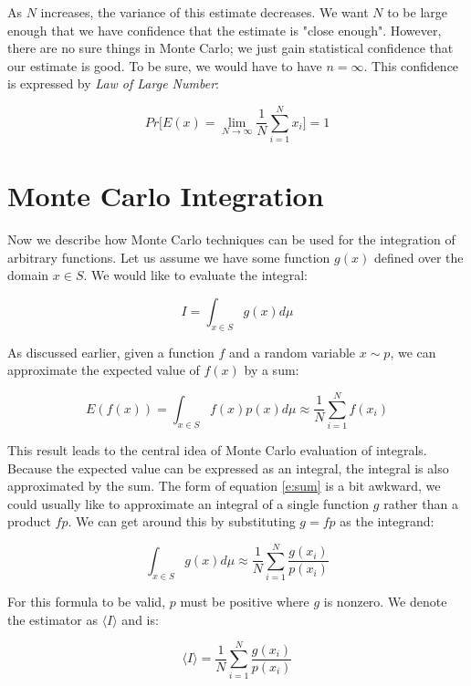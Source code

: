 As $N$ increases, the variance of this estimate decreases. We want $N$ to be large enough that we have confidence that the estimate is "close enough". However, there are no sure things in Monte Carlo; we just gain statistical confidence that our estimate is good. To be sure, we would have to have $n=\infty$. This confidence is expressed by \textit{Law of Large Number}:

\begin{equation}
	Pr\Bigg[ E(x)=\lim_{N \to \infty}\frac{1}{N}\sum_{i=1}^{N}x_i \Bigg]=1
\end{equation} 



\section{Monte Carlo Integration}\label{sec:Monte-Carlo-Integration}
Now we describe how Monte Carlo techniques can be used for the integration of arbitrary functions. Let us assume we have some function $g(x)$ defined over the domain $x\in S$. We would like to evaluate the integral:

\begin{equation}
	I=\int_{x\in S}g(x)d\mu
\end{equation}

As discussed earlier, given a function $f$ and a random variable $x\sim p$, we can approximate the expected value of $f(x)$ by a sum:

\begin{equation}\label{e:sum}
	E(f(x))=\int_{x\in S}f(x)p(x)d\mu\approx\frac{1}{N}\sum_{i=1}^{N}f(x_i)
\end{equation}

This result leads to the central idea of Monte Carlo evaluation of integrals. Because the expected value can be expressed as an integral, the integral is also approximated by the sum. The form of equation \ref{e:sum} is a bit awkward, we could usually like to approximate an integral of a single function $g$ rather than a product $fp$. We can get around this by substituting $g=fp$ as the integrand:

\begin{equation}
	\int_{x\in S}g(x)d\mu\approx\frac{1}{N}\sum_{i=1}^{N}\frac{g(x_i)}{p(x_i)}
\end{equation}

For this formula to be valid, $p$ must be positive where $g$ is nonzero. We denote the estimator as $\langle I\rangle$ and is:

\begin{equation}
	\langle I\rangle=\frac{1}{N}\sum_{i=1}^{N}\frac{g(x_i)}{p(x_i)}
\end{equation}

